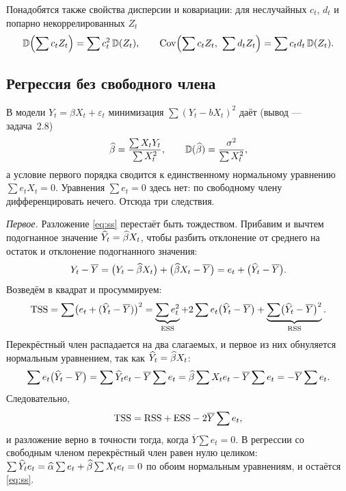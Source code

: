 Понадобятся также свойства дисперсии и ковариации: для неслучайных $c_t$, $d_t$
и попарно некоррелированных $Z_t$
\begin{equation}
  \mathbb{D}\Bigl(\sum c_tZ_t\Bigr) = \sum c_t^2\,\mathbb{D}(Z_t),
  \qquad
  \mathrm{Cov}\Bigl(\sum c_tZ_t,\ \sum d_tZ_t\Bigr) = \sum c_td_t\,\mathbb{D}(Z_t).
  \label{eq:D-props}
\end{equation}

\subsection{Регрессия без свободного члена}\label{sec:noint}

В модели $Y_t = \beta X_t + \varepsilon_t$ минимизация $\sum(Y_t - bX_t)^2$ даёт
(вывод — задача~2.8)
\begin{equation}
  \widehat{\beta} = \frac{\sum X_tY_t}{\sum X_t^2},
  \qquad
  \mathbb{D}(\widehat{\beta}) = \frac{\sigma^2}{\sum X_t^2},
  \label{eq:noint}
\end{equation}
а условие первого порядка сводится к единственному нормальному уравнению
$\sum e_tX_t = 0$. Уравнения $\sum e_t = 0$ здесь нет: по свободному члену
дифференцировать нечего. Отсюда три следствия.

\emph{Первое.} Разложение \eqref{eq:ss} перестаёт быть тождеством. Прибавим и
вычтем подогнанное значение $\widehat{Y}_t = \widehat{\beta} X_t$, чтобы разбить отклонение от
среднего на остаток и отклонение подогнанного значения:
\[
  Y_t - \overline{Y}
  = \bigl(Y_t - \widehat{\beta} X_t\bigr) + \bigl(\widehat{\beta} X_t - \overline{Y}\bigr)
  = e_t + \bigl(\widehat{Y}_t - \overline{Y}\bigr).
\]
Возведём в квадрат и просуммируем:
\[
  \mathrm{TSS} = \sum\bigl(e_t + (\widehat{Y}_t - \overline{Y})\bigr)^2
       = \underbrace{\sum e_t^2}_{\mathrm{ESS}}
         + 2\sum e_t\bigl(\widehat{Y}_t - \overline{Y}\bigr)
         + \underbrace{\sum\bigl(\widehat{Y}_t - \overline{Y}\bigr)^2}_{\mathrm{RSS}}.
\]
Перекрёстный член распадается на два слагаемых, и первое из них обнуляется
нормальным уравнением, так как $\widehat{Y}_t = \widehat{\beta} X_t$:
\[
  \sum e_t\bigl(\widehat{Y}_t - \overline{Y}\bigr)
  = \sum \widehat{Y}_te_t - \overline{Y}\sum e_t
  = \widehat{\beta}\sum X_te_t - \overline{Y}\sum e_t
  = -\overline{Y}\sum e_t .
\]
Следовательно,
\begin{equation}
  \mathrm{TSS} = \mathrm{RSS} + \mathrm{ESS} - 2\overline{Y}\sum e_t ,
  \label{eq:decomp-noint}
\end{equation}
и разложение верно в точности тогда, когда $\overline{Y}\sum e_t = 0$. В
регрессии со свободным членом перекрёстный член равен нулю целиком:
$\sum \widehat{Y}_te_t = \widehat{\alpha}\sum e_t + \widehat{\beta}\sum X_te_t = 0$ по обоим нормальным
уравнениям, и остаётся \eqref{eq:ss}.

